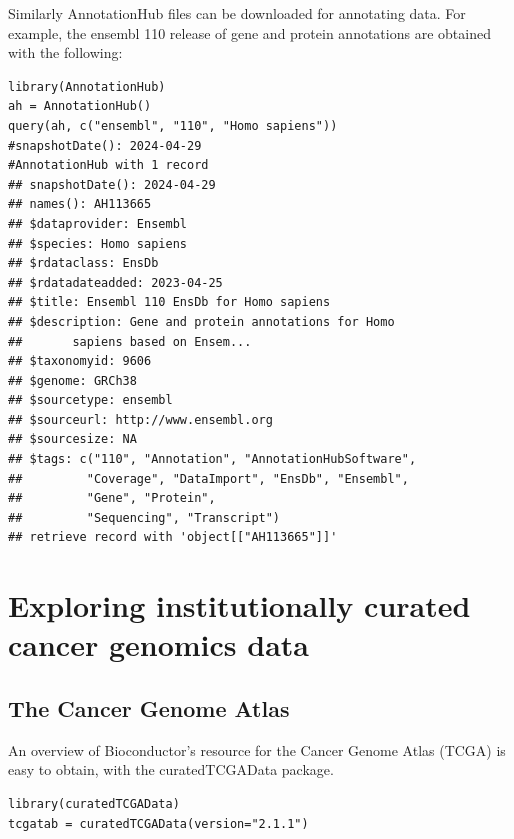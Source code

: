 \documentclass[graybox]{svmult}
\begin{document}
Similarly AnnotationHub files can be downloaded for annotating data. For example,
the ensembl 110 release of gene and protein annotations are obtained with the
following:

\begin{shaded}
\begin{verbatim}
library(AnnotationHub)
ah = AnnotationHub()
query(ah, c("ensembl", "110", "Homo sapiens"))
#snapshotDate(): 2024-04-29
#AnnotationHub with 1 record
## snapshotDate(): 2024-04-29
## names(): AH113665
## $dataprovider: Ensembl
## $species: Homo sapiens
## $rdataclass: EnsDb
## $rdatadateadded: 2023-04-25
## $title: Ensembl 110 EnsDb for Homo sapiens
## $description: Gene and protein annotations for Homo 
##       sapiens based on Ensem...
## $taxonomyid: 9606
## $genome: GRCh38
## $sourcetype: ensembl
## $sourceurl: http://www.ensembl.org
## $sourcesize: NA
## $tags: c("110", "Annotation", "AnnotationHubSoftware", 
##         "Coverage", "DataImport", "EnsDb", "Ensembl", 
##         "Gene", "Protein", 
##         "Sequencing", "Transcript") 
## retrieve record with 'object[["AH113665"]]' 
\end{verbatim}
\end{shaded}



\section{Exploring institutionally curated cancer genomics data}\label{exploring-institutionally-curated-cancer-genomics-data}


\subsection{The Cancer Genome Atlas}\label{the-cancer-genome-atlas}

An overview of Bioconductor's resource for the Cancer
Genome Atlas (TCGA) is easy to obtain, with the
curatedTCGAData package.

\begin{shaded}
\begin{verbatim}
library(curatedTCGAData)
tcgatab = curatedTCGAData(version="2.1.1")
\end{verbatim}
\end{shaded}
\end{document}
